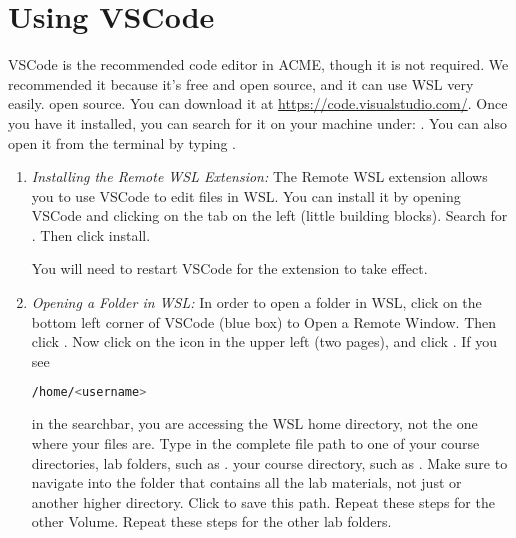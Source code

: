 \section*{Using VSCode}
VSCode is the recommended code editor in ACME, though it is not required.
We recommended it because it's free and
\ifwindows
open source, and it can use WSL very easily.
\else
open source.
\fi
You can download it at \url{https://code.visualstudio.com/}.
Once you have it installed, you can search for it on your machine under: .
You can also open it from the terminal by typing .
\ifwindows
\begin{enumerate}
    \item \emph{Installing the Remote WSL Extension:}
    The Remote WSL extension allows you to use VSCode to edit files in WSL.
    You can install it by opening VSCode and clicking on the  tab on the left (little building blocks).
    Search for .
    Then click install.

    You will need to restart VSCode for the extension to take effect.

    \item \emph{Opening a Folder in WSL:}
    In order to open a folder in WSL, click on the bottom left corner of VSCode (blue box) to Open a Remote Window.
    Then click .
    Now click on the  icon in the upper left (two pages), and click .
    If you see 
    \begin{lstlisting}[language=bash]
    /home/<username>
    \end{lstlisting}
    in the searchbar, you are accessing the WSL home directory, not the one where your files are.
    Type in the complete file path to
    \ifbootcamp
    one of your
    \ifbyu
    course directories,
    \else
    lab folders,
    \fi 
    such as .
    \else 
    your course directory, such as .
    \fi
    Make sure to navigate into the folder that contains all the lab materials, not just  or another higher directory.
    Click  to save this path.
    \ifbootcamp
    \ifbyu
    Repeat these steps for the other Volume.
    \else 
    Repeat these steps for the other lab folders.
    \fi
    \fi
\end{enumerate}
\fi


